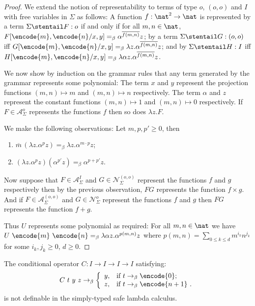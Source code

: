 \begin{proof}
We extend the notion of representability to terms of type $o$,
$(o,o)$ and $I$ with free variables in $\Sigma$ as follows: A
function $f:\nat^2 \rightarrow \nat$ is represented by a term
$\Sigma \stentail F:o$ if and only if for all $m,n\in\nat$,
$F[\encode{m}, \encode{n}/x,y] =_\beta \alpha^{\overline{f(m,n)}}
z$; by a term $\Sigma \stentail G:(o,o)$ iff $G[\encode{m},
\encode{n}/x,y] =_\beta \lambda z . \alpha^{\overline{f(m,n)}} z$;
and by $\Sigma \stentail H:I$ iff $H[\encode{m}, \encode{n}/x,y]
=_\beta \lambda \alpha z . \alpha^{\overline{f(m,n)}} z$.

We now show by induction on the grammar rules that any term
generated by the grammar represents some polynomial: The term $x$
and $y$ represent the projection functions $(m,n)\mapsto m$ and
$(m,n)\mapsto n$ respectively. The term $\alpha$ and $z$ represent
the constant functions $(m,n)\mapsto 1$ and $(m,n)\mapsto 0$
respectively. If $F\in \mathcal{A}^o_\Sigma$ represents the
functions $f$ then so does $\lambda z. F$.

We make the following observations: Let $m, p, p' \geq 0$, then
\begin{enumerate}
\item ${\overline m} \, (\lambda z.\alpha^p z) =_\beta \lambda z . \alpha^{m \cdot p} z$;
\item $(\lambda z.\alpha^p z) (\alpha^{p'} z) =_\beta \alpha^{p + p'} z$.
\end{enumerate}

Now suppose that $F\in \mathcal{A}^I_\Sigma$ and $G\in
\mathcal{N}^{(o,o)}_\Sigma$ represent the functions $f$ and $g$
respectively then by the previous observation, $F G$ represents the
function $f \times g$. And if $F\in \mathcal{A}^{(o,o)}_\Sigma$ and
$G\in \mathcal{N}^o_\Sigma$ represent the functions $f$ and $g$ then
$F G$ represents the function $f+g$.

Thus $U$ represents some polynomial as required: For all $m,n\in
\nat$ we have $U~\encode{m}~\encode{n} =_\beta \lambda \alpha z .
\alpha^{p(m,n)} z$ where $p(m,n) = \sum_{0\leq k \leq d} m^{i_k}
n^{j_k}$ for some $i_k,j_k \geq 0$, $d\geq 0$.
\end{proof}

\begin{corollary}
The conditional operator $C:I\rightarrow I\rightarrow I \rightarrow
I$ satisfying:
$$
C~t~y~z \rightarrow_\beta \left\{
                            \begin{array}{ll}
                              y, & \hbox{if $t
\rightarrow_\beta \encode{0}$;} \\
                              z, & \hbox{if
$t \rightarrow_\beta \encode{n+1}$ .}
                            \end{array}
                          \right.
$$
is not definable in the simply-typed safe lambda calculus.
\end{corollary}

